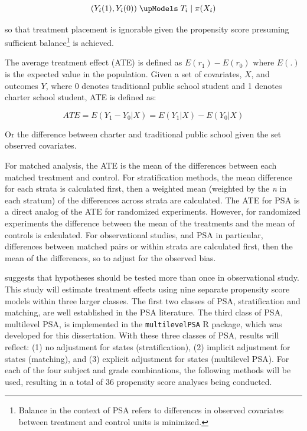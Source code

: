 \documentclass[letterpaper,12p,twoside]{article} %
\begin{document}
$$({ Y }_{ i }(1),{ Y }_{ i }(0)) \; \upModels \; { T }_{ i } \; | \; \pi({ X }_{ i })$$

\noindent so that treatment placement is ignorable given the propensity score presuming sufficient balance\footnote{Balance in the context of PSA refers to differences in observed covariates between treatment and control units is minimized.} is achieved.

The average treatment effect (ATE) is defined as $E(r_1) - E(r_0)$ where $E(.)$ is the expected value in the population. Given a set of covariates, $X$, and outcomes $Y$, where 0 denotes traditional public school student and 1 denotes charter school student, ATE is defined as:

$$ATE=E(Y_{1}-Y_{0}|X)=E(Y_{1}|X)-E(Y_{0}|X)$$
 
\noindent Or the difference between charter and traditional public school given the set observed covariates.

For matched analysis, the ATE is the mean of the differences between each matched treatment and control. For stratification methods, the mean difference for each strata is calculated first, then a weighted mean (weighted by the \textit{n} in each stratum) of the differences across strata are calculated. The ATE for PSA is a direct analog of the ATE for randomized experiments. However, for randomized experiments the difference between the mean of the treatments and the mean of controls is calculated. For observational studies, and PSA in particular, differences between matched pairs or within strata are calculated first, then the mean of the differences, so to adjust for the observed bias.

 suggests that hypotheses should be tested more than once in observational study. This study will estimate treatment effects using nine separate propensity score models within three larger classes. The first two classes of PSA, stratification and matching, are well established in the PSA literature. The third class of PSA, multilevel PSA, is implemented in the \texttt{multilevelPSA} R package, which was developed for this dissertation. With these three classes of PSA, results will reflect: (1) no adjustment for states (stratification), (2) implicit adjustment for states (matching), and (3) explicit adjustment for states (multilevel PSA). For each of the four subject and grade combinations, the following methods will be used, resulting in a total of 36 propensity score analyses being conducted.
\end{document}
